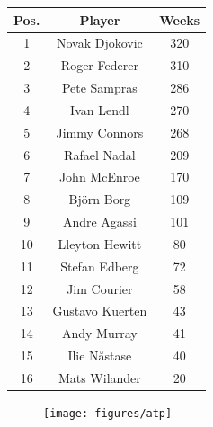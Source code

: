 \documentclass[a4paper,10pt]{book}
\theoremstyle{definition}
\newif\ifen
\newif\ifes
\newcommand{\en}[1]{\ifen#1\fi}
\newcommand{\es}[1]{\ifes#1\fi}
\begin{document}
%
\en{Finally, we use the \texttt{convergence()} method to obtain TrueSkill Through Time estimates explicitly selecting the convergence criterion: when the change between iterations is less than $0.01$ or when ten iterations are performed. }%
\es{Finalmente, usamos el método \texttt{convergence()} para obtener las estimaciones de TrueSkill Through Time, indicando explícitamente el criterio de corte: cuando el cambio entre iteraciones sea menor a $0.01$, o cuando se alcanzan las $10$ iteraciones. }%
%
\begin{figure}[ht!]
\begin{subtable}[b]{0.29\textwidth}
    \scriptsize
    \begin{tabular}{c | c | c}
    Pos. &  Player                  &   Weeks\\
    \hline
    1       &   Novak Djokovic      &   320\\
    2       &   Roger Federer       &	310\\
    3       &	Pete Sampras        &   286\\
    4       &   Ivan Lendl          &   270\\
    5       &   Jimmy Connors       &   268\\
    6       &   Rafael Nadal        &   209\\
    7       &   John McEnroe        &   170\\
    8       &   Bj\"orn Borg        &   109\\
    9       &   Andre Agassi        &   101\\
    10      &   Lleyton Hewitt      &   80 \\
    11 	    &   Stefan Edberg       & 	72\\
    12 	    &   Jim Courier         & 	58\\
    13 	    &   Gustavo Kuerten     & 	43\\
    14 	    &   Andy Murray         & 	41\\
    15 	    &   Ilie N\u{a}stase    & 	40\\
    16 	    &   Mats Wilander       & 	20 \\
    \end{tabular}
    \caption{
    \en{Weeks at No. 1 }%
    \es{Semanas como No. 1 }%
    }
    \label{tab:atp_weeks}
\end{subtable}
%
\begin{subfigure}[b]{0.7\linewidth}
    \centering
    \texttt{[image: figures/atp]}
    \caption{
    \en{Estimated learning curves for some famous male players. }%
}
\end{subfigure}
\end{figure}
\end{document}
